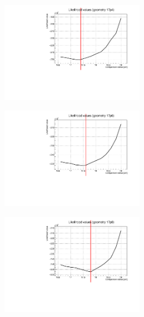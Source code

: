 \documentclass[a4paper, 11pt]{report}
\begin{document}
\begin{figure}[htbp]
\begin{minipage}[b]{.32\textwidth}
\includegraphics[width=6cm, height=4.6cm]{figs/likelihood250LowStat/likelihood17p4.pdf}
\end{minipage}\hfill
\begin{minipage}[b]{.32\textwidth}
\includegraphics[width=6cm, height=4.6cm]{figs/likelihood250LowStat/likelihood17p6.pdf}
\end{minipage} \hfill
\begin{minipage}[b]{.32\textwidth}
\includegraphics[width=6cm, height=4.6cm]{figs/likelihood250LowStat/likelihood17p8.pdf}
\end{minipage} \hfill \vspace{10pt}


\end{figure}
\end{document}
